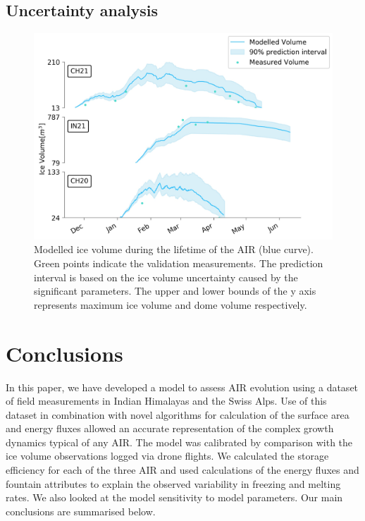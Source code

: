 \documentclass[utf8]{frontiersSCNS} %
\begin{document}

\subsection{Uncertainty analysis}
\begin{figure}
	\begin{center}
		\includegraphics[width=\linewidth]{Figures/icev_results.jpg}
	\end{center}
	\caption{Modelled ice volume during the lifetime of the AIR (blue curve). Green points indicate the validation
		measurements. The prediction interval is based on the ice volume uncertainty caused by the significant parameters.  The
		upper and lower bounds of the y axis represents maximum ice volume and dome volume respectively.  }
	\label{fig:results} \end{figure}

\section{Conclusions}
In this paper, we have developed a model to assess AIR evolution using a dataset of field measurements in Indian
Himalayas and the Swiss Alps. Use of this dataset in combination with novel algorithms for calculation of the surface
area and energy fluxes allowed an accurate representation of the complex growth dynamics typical of any AIR. The model
was calibrated by comparison with the ice volume observations logged via drone flights. We calculated the storage
efficiency for each of the three AIR and used calculations of the energy fluxes and fountain attributes to explain the
observed variability in freezing and melting rates. We also looked at the model sensitivity to model parameters. Our
main conclusions are summarised below.
\end{document}
